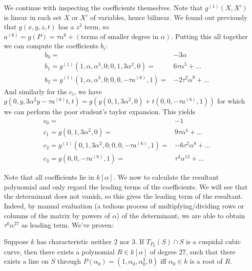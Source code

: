 We continue with inspecting the coefficients themselves.
Note that $g^{(1)}(X,X')$ is linear in each set $X$ or $X'$ of variables, hence bilinear.
We found out previously that $g(x,y,z,t)$ has a $z^2$ term, so $a^{(6)} = g(P) = \tau\alpha^6 + (\text{terms of smaller degree in } \alpha)$.
Putting this all together we can compute the coefficients $b_i$:
\begin{align}
b_0 =& -3\alpha \\
b_1 = g^{(1)}(1,\alpha,\alpha^3,0;0,1,3\alpha^2,0) =& 6\tau\alpha^5 + ... \\
b_2 = g^{(1)}(1,\alpha,\alpha^3,0;0,0,-\tau a^{(6)},1) =& -2\tau^2\alpha^9 + ...
\end{align}
And similarly for the $c_i$, we have $g(0,y,3\alpha^2y-\tau a^{(6)}t,t) = g(y(0,1,3\alpha^2,0)+t(0,0,-\tau a^{(6)},1))$ for which we can perform the poor student's taylor expansion. This yields
\begin{align}
c_0 =& -1\\
c_1 = g(0,1,3\alpha^2,0) =& 9\tau\alpha^4 + ... \\
c_2 = g^{(1)}(0,1,3\alpha^2,0;0,0,-\tau a^{(6)},1) =& -6\tau^2\alpha^8 + ... \\
c_3 = g(0,0,-\tau a^{(6)},1) =& \tau^3\alpha^{12} + ...
\end{align}

Note that all coefficients lie in $k[\alpha]$.
We now to calculate the resultant polynomial and only regard the leading terms of the coefficients.
We will see that the determinant does not vanish, so this gives the leading term of the resultant.
Indeed, by manual evaluation (a tedious process of multiplying/dividing rows or columns of the matrix by powers of $\alpha$) of the determinant, we are able to obtain $\tau^6\alpha^{27} $ as leading term.
We've proven:
\begin{proposition}
Suppose $k$ has characteristic neither 2 nor 3.
If $T_{P_0}(S) \cap S$ is a cuspidal cubic curve, then there exists a polynomial $R \in k[\alpha]$ of degree 27, such that there exists a line on $S$ through $P(\alpha_0) = (1,\alpha_0,\alpha_0^3,0)$ iff $\alpha_0 \in k$ is a root of $R$.
\end{proposition}


